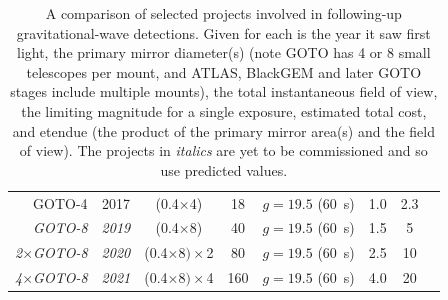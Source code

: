 \begin{colsection}
\begin{table}[t]
\begin{center}
\begin{tabular}{r|ccccccl}
            \\
            GOTO-4 &
            2017 &
            (0.4$\times$4) &
            18 &
            $g=19.5$ (\SI{60}{\second}) &
            1.0 &
            2.3
            \\
            \textit{GOTO-8} &
            \textit{2019} &
            (0.4$\times$8) &
            40 &
            $g=19.5$ (\SI{60}{\second}) &
            1.5 &
            5
            \\
            \textit{2$\times$GOTO-8} &
            \textit{2020} &
            (0.4$\times$8$)\times$2 &
            80 &
            $g=19.5$ (\SI{60}{\second}) &
            2.5 &
            10
            \\
            \textit{4$\times$GOTO-8} &
            \textit{2021} &
            (0.4$\times$8$)\times$4 &
            160 &
            $g=19.5$ (\SI{60}{\second}) &
            4.0 &
            20
            \\
        \end{tabular}
    \end{center}
    \caption[Comparison of projects involved in gravitational-wave follow-up]{
        A comparison of selected projects involved in following-up gravitational-wave detections. Given for each is the year it saw first light, the primary mirror diameter(s) (note GOTO has 4 or 8 small telescopes per mount, and ATLAS, BlackGEM and later GOTO stages include multiple mounts), the total instantaneous field of view, the limiting magnitude for a single exposure, estimated total cost, and etendue (the product of the primary mirror area(s) and the field of view). The projects in \textit{italics} are yet to be commissioned and so use predicted values. %
    }\label{tab:rivals}
\end{table}

\end{colsection}


